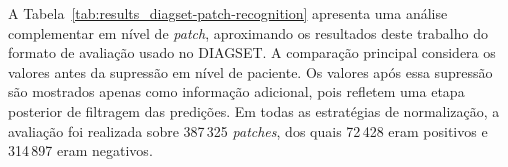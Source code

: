 \begin{table}[!htb]
\centering
\caption{Avaliação separada de pacientes positivos e negativos por estratégia de normalização em DIAGSET.}
\label{tab:results_diagset-rule6}
\small
{}
\end{table}

A Tabela~\ref{tab:results_diagset-patch-recognition} apresenta uma análise
complementar em nível de \textit{patch}, aproximando os resultados deste trabalho
do formato de avaliação usado no DIAGSET. A comparação principal considera os
valores antes da supressão em nível de paciente. Os valores após essa supressão
são mostrados apenas como informação adicional, pois refletem uma etapa posterior
de filtragem das predições. Em todas as estratégias de normalização, a avaliação
foi realizada sobre 387\,325 \textit{patches}, dos quais 72\,428 eram positivos e
314\,897 eram negativos.

